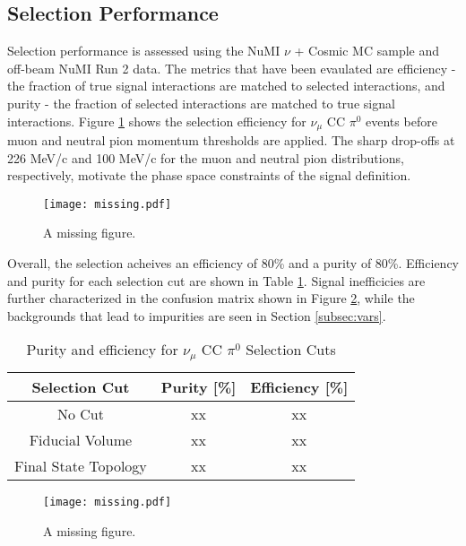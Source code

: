\documentclass[../main.tex]{subfiles}
\begin{document}
\subsection{Selection Performance}
Selection performance is assessed using the NuMI $\nu$ + Cosmic MC sample and off-beam NuMI Run 2 data.  The metrics that have been evaulated are efficiency - the fraction of true signal interactions are matched to selected interactions, and purity - the fraction of selected interactions are matched to true signal interactions.  Figure \ref{fig:efficiency_momentum} shows the selection efficiency for $\nu_{\mu}$ CC $\pi^{0}$ events before muon and neutral pion momentum thresholds are applied.  The sharp drop-offs at 226 MeV/c and 100 MeV/c for the muon and neutral pion distributions, respectively, motivate the phase space constraints of the signal definition.

\begin{figure}[H]
    \center
    \texttt{[image: missing.pdf]}
    \caption[text]{A missing figure.}
    \label{fig:efficiency_momentum}
\end{figure}

Overall, the selection acheives an efficiency of 80\% and a purity of 80\%.  Efficiency and purity for each selection cut are shown in Table \ref{Tab:pureff}.  Signal inefficicies are further characterized in the confusion matrix shown in Figure \ref{fig:efficiency_confusion}, while the backgrounds that lead to impurities are seen in Section \ref{subsec:vars}.

\begin{table}[ht]
    \caption{Purity and efficiency for $\nu_{\mu}$ CC $\pi^{0}$ Selection Cuts}
    \vspace{0.1cm}
    \centering
    \begin{tabular}{ c c c } 
    \hline
    Selection Cut & Purity [\%] & Efficiency [\%]  \\
    \hline
    No Cut & xx & xx \\ 
    Fiducial Volume & xx & xx \\
    Final State Topology & xx & xx \\ 
    \hline
    \end{tabular}
    \label{Tab:pureff}
\end{table}

\begin{figure}[H]
    \center
    \texttt{[image: missing.pdf]}
    \caption[text]{A missing figure.}
    \label{fig:efficiency_confusion}
\end{figure}
\end{document}
